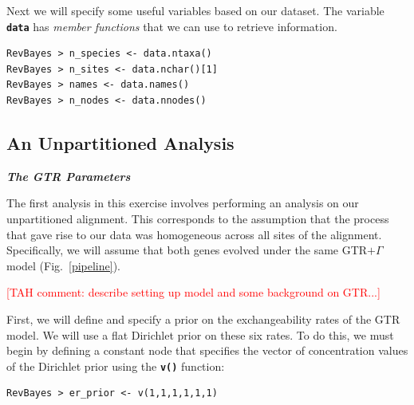\documentclass[11pt]{article}
\newcommand{\taha}[1]{{\textcolor{red}{[TAH comment: #1]}}} %
\newcommand{\cl}[1]{{\texttt{\textbf{#1}}}}
\newcommand{\mbcl}[1]{\exs{\cl{MrBayes > {#1}}}}
\begin{document}
Next we will specify some useful variables based on our dataset. The variable \cl{data} has \textsl{member functions} that we can use to retrieve information. 
{\tt \begin{snugshade*}
\begin{lstlisting}
RevBayes > n_species <- data.ntaxa()
RevBayes > n_sites <- data.nchar()[1]
RevBayes > names <- data.names()
RevBayes > n_nodes <- data.nnodes()
\end{lstlisting}
\end{snugshade*}}

\bigskip
\subsection{An Unpartitioned Analysis}\label{secUnif} 

\textbf{\textit{The GTR Parameters}}

The first analysis in this exercise involves performing an analysis on our unpartitioned alignment. 
This corresponds to the assumption that the process that gave rise to our data was homogeneous across all sites of the alignment. 
Specifically, we will assume that both genes evolved under the same GTR$+\Gamma$ model (Fig.~\ref{pipeline}). 

\taha{describe setting up model and some background on GTR...}


%
%
%

First, we will define and specify a prior on the exchangeability rates of the GTR model. We will use a flat Dirichlet prior on these six rates. To do this, we must begin by defining a constant node that specifies the vector of concentration values of the Dirichlet prior using the \cl{v()} function:
{\tt \begin{snugshade*}
\begin{lstlisting}
RevBayes > er_prior <- v(1,1,1,1,1,1) 
\end{lstlisting}
\end{snugshade*}}
\end{document}
